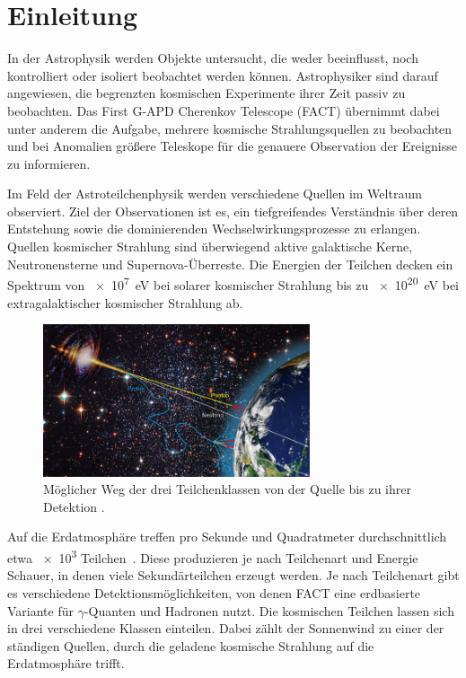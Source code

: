 \chapter{Einleitung}
In der Astrophysik werden Objekte untersucht, die weder beeinflusst, noch kontrolliert oder isoliert beobachtet werden können.
Astrophysiker sind darauf angewiesen, die begrenzten kosmischen Experimente ihrer Zeit passiv zu beobachten. 
Das First G-APD Cherenkov Telescope (FACT) übernimmt dabei unter anderem die Aufgabe, mehrere kosmische Strahlungsquellen zu beobachten und bei Anomalien größere Teleskope für die genauere Observation der Ereignisse zu informieren. 

Im Feld der Astroteilchenphysik werden verschiedene Quellen im Weltraum observiert.
Ziel der Observationen ist es, ein tiefgreifendes Verständnis über deren Entstehung sowie die dominierenden Wechselwirkungsprozesse zu erlangen. 
Quellen kosmischer Strahlung sind überwiegend aktive galaktische Kerne, Neutronensterne und Supernova-Überreste. 
Die Energien der Teilchen decken ein Spektrum von \SI{e7}{\electronvolt} bei solarer kosmischer Strahlung bis zu \SI{e20}{\electronvolt} bei extragalaktischer kosmischer Strahlung ab. 

\begin{figure}
  \centering
  \includegraphics[width=0.7\textwidth]{./images/sources-detection.jpg}
  \caption{Möglicher Weg der drei Teilchenklassen von der Quelle bis zu ihrer Detektion \cite{overview-detec}.}
\end{figure}

Auf die Erdatmosphäre treffen pro Sekunde und Quadratmeter durchschnittlich etwa \num{e3} Teilchen~\cite{gaisser}.
Diese produzieren je nach Teilchenart und Energie Schauer, in denen viele Sekundärteilchen erzeugt werden. 
Je nach Teilchenart gibt es verschiedene Detektionsmöglichkeiten, von denen FACT eine erdbasierte Variante für $\gamma$-Quanten und Hadronen nutzt. 
Die kosmischen Teilchen lassen sich in drei verschiedene Klassen einteilen. 
Dabei zählt der Sonnenwind zu einer der ständigen Quellen, durch die geladene kosmische Strahlung auf die Erdatmosphäre trifft.

